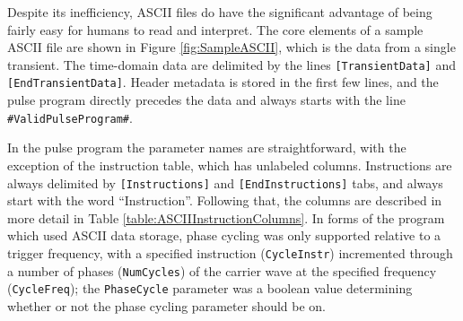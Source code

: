 \documentclass[PaulGanssle-Thesis.tex]{subfiles}
\begin{document}
Despite its inefficiency, ASCII files do have the significant advantage of being fairly easy for humans to read and interpret. The core elements of a sample ASCII file are shown in Figure \ref{fig:SampleASCII}, which is the data from a single transient. The time-domain data are delimited by the lines \texttt{[TransientData]} and \texttt{[EndTransientData]}. Header metadata is stored in the first few lines, and the pulse program directly precedes the data and always starts with the line \texttt{\#{}ValidPulseProgram\#}.

In the pulse program the parameter names are straightforward, with the exception of the instruction table, which has unlabeled columns. Instructions are always delimited by \texttt{[Instructions]} and \texttt{[EndInstructions]} tabs, and always start with the word ``Instruction''. Following that, the columns are described in more detail in Table \ref{table:ASCIIInstructionColumns}. In forms of the program which used ASCII data storage, phase cycling was only supported relative to a trigger frequency, with a specified instruction (\texttt{CycleInstr}) incremented through a number of phases (\texttt{NumCycles}) of the carrier wave at the specified frequency (\texttt{CycleFreq}); the \texttt{PhaseCycle} parameter was a boolean value determining whether or not the phase cycling parameter should be on.
\end{document}
